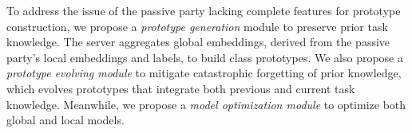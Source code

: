 To address the issue of the passive party lacking complete features for prototype construction, we propose a \textit{prototype generation} module to preserve prior task knowledge. 
The server aggregates global embeddings, derived from the passive party's local embeddings and labels, to build class prototypes.
We also propose a \textit{prototype evolving module} to mitigate catastrophic forgetting of prior knowledge, which evolves prototypes that integrate both previous and current task knowledge.
Meanwhile, we propose a \textit{model optimization module} to optimize both global and local models.




